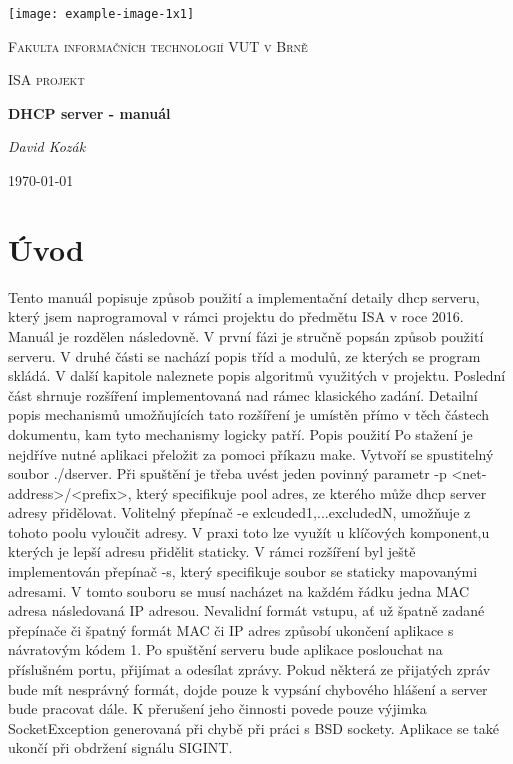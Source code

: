 \documentclass[12pt,a4paper]{report}
\begin{document}
\begin{titlepage}
	\centering
	\texttt{[image: example-image-1x1]}\par\vspace{1cm}
	{\scshape\LARGE Fakulta informačních technologií VUT v Brně \par}
	\vspace{1cm}
	{\scshape\Large ISA projekt \par}
	\vspace{1.5cm}
	{\huge\bfseries DHCP server - manuál\par}
	\vspace{2cm}
	{\Large\itshape David Kozák\par}
	\vfill
	\vfill

	{\large \today\par}
\end{titlepage}

\tableofcontents
\newpage

\chapter{Úvod}

Tento manuál popisuje způsob použití a implementační detaily dhcp serveru, který jsem naprogramoval v rámci projektu do předmětu ISA v roce 2016.  Manuál je rozdělen následovně. V první fázi je stručně popsán způsob použití serveru.
V druhé části se nachází popis tříd a modulů, ze kterých se program skládá.
V další kapitole naleznete popis algoritmů využitých v projektu.
Poslední část shrnuje rozšíření implementovaná nad rámec klasického zadání. Detailní popis mechanismů umožňujících tato rozšíření je umístěn přímo v těch částech dokumentu, kam tyto mechanismy logicky patří.
Popis použití
Po stažení je nejdříve nutné aplikaci přeložit za pomoci příkazu make. Vytvoří se spustitelný soubor ./dserver. Při spuštění je třeba uvést jeden povinný parametr -p <net-address>/<prefix>,
který specifikuje pool adres, ze kterého může dhcp server adresy přidělovat. Volitelný přepínač -e exlcuded1,...excludedN, umožňuje z tohoto poolu vyloučit adresy. V praxi toto lze využít u klíčových komponent,u kterých je lepší adresu přidělit staticky. V rámci rozšíření byl ještě implementován přepínač -s, který specifikuje soubor se staticky mapovanými adresami. V tomto souboru se musí nacházet na každém řádku jedna MAC adresa následovaná IP adresou. Nevalidní formát vstupu, ať už špatně zadané přepínače či špatný formát MAC či IP adres způsobí ukončení aplikace s návratovým kódem 1.
Po spuštění serveru bude aplikace poslouchat na příslušném portu, přijímat a odesílat zprávy. Pokud některá ze přijatých zpráv bude mít nesprávný formát, dojde pouze k vypsání chybového hlášení a server bude pracovat dále. K přerušení jeho činnosti povede pouze výjimka SocketException generovaná při chybě při práci s BSD sockety. Aplikace se také ukončí při obdržení signálu SIGINT.
\end{document}
